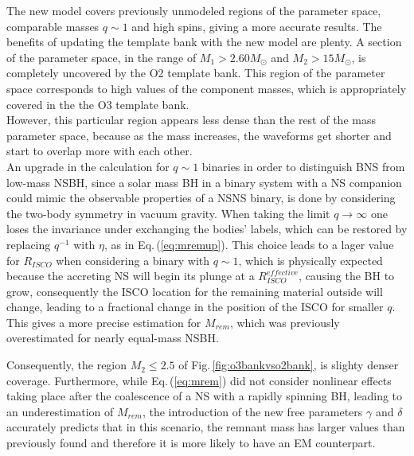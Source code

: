 \documentclass[binding=0.6cm, LaM]{sapthesis}
\begin{document}
        The new model covers previously unmodeled regions of the parameter space, comparable masses $q \sim 1$ and high spins,
        giving a more accurate  results.
	The benefits of updating the template bank with the new model are plenty.
	A section of the parameter space, in the range  of $M_1 >  2.60 M_\odot$  and $M_2 > 15 M_\odot $,
	is completely uncovered by the O2 template bank.
	This region of the parameter space corresponds to high values of the component masses,
	which is appropriately covered in the the O3 template bank. \\
	However, this particular region appears less dense than the rest of the mass parameter space, 
	because as the mass increases, the waveforms get shorter and start to overlap more with each other. \\
        An upgrade in the calculation for $q \sim 1$ binaries in order to distinguish BNS from low-mass NSBH,
        since a solar mass BH in a binary system with a NS companion could mimic the observable properties of a NSNS binary,
        is done by considering the two-body symmetry in vacuum gravity.
        When taking the limit $q \rightarrow \infty$ one loses the invariance under exchanging the bodies' labels,
        which can be restored by replacing $q^{-1}$ with $\eta$, as in Eq.\,(\ref{eq:mremup}).
        This choice leads to a lager value for $R_{ISCO}$ when considering a binary with $q \sim 1$,
        which is physically expected because the accreting NS will begin its plunge at a $R_{ISCO}^{effective}$,
        causing the BH to grow, consequently the ISCO location for the remaining material outside will change,
        leading to a fractional change in the position of the ISCO for smaller $q$.
        This gives a more precise estimation for $M_{rem}$, which was previously overestimated for nearly equal-mass NSBH.

        Consequently, the region $M_2 \leq 2.5$ of Fig.\,\ref{fig:o3bankvso2bank}, 
	is slighty denser coverage.
        Furthermore, while Eq.\,(\ref{eq:mrem}) did not consider nonlinear effects taking place after the coalescence of a NS
        with a rapidly spinning BH, leading to an underestimation of $M_{rem}$,
        the introduction of the new free parameters $\gamma$ and $\delta$ accurately predicts that in this scenario,
        the remnant mass has larger values than previously found and therefore it is more likely to have an EM counterpart.
\end{document}
